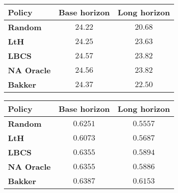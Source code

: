 \begin{figure}[h]
    \begin{minipage}[c]{0.48\textwidth}
    \begin{center}
        \begin{tabular}{lcc}
         \toprule
        \multirow{1}{*}{\textbf{Policy}}& Base horizon& Long horizon\\
        \midrule
        \textbf{Random} & $24.22$ & $20.68$ \\
        \textbf{LtH} & $24.25$ & $23.63$\\
        \textbf{LBCS} & $24.57$& $23.82$\\
        \textbf{NA Oracle}& $24.56$& $23.82$\\           
        \textbf{Bakker} & $24.37$& $22.50$ \\
        \bottomrule
        \end{tabular}
        \label{tab:bakker_comp_knee_psnr}     \end{center}
    \end{minipage}
    \hfill
    \begin{minipage}[c]{0.48\textwidth}
    \begin{center}
        \begin{tabular}{lcc}
            \toprule
           \multirow{1}{*}{\textbf{Policy}}& Base horizon& Long horizon\\
           \midrule
            \textbf{Random}& $0.6251$& $0.5557$ \\
            \textbf{LtH}& $0.6073$& $0.5687$\\
            \textbf{LBCS}& $0.6355$& $0.5894$\\
            \textbf{NA Oracle}& $0.6355$& $0.5886$\\           
            \textbf{Bakker}& $0.6387$& $0.6153$ \\
           \bottomrule
           \end{tabular}
           \label{tab:bakker_comp_knee_ssim} 
    \end{center}
    \end{minipage}
    \end{figure}
    
    
    
